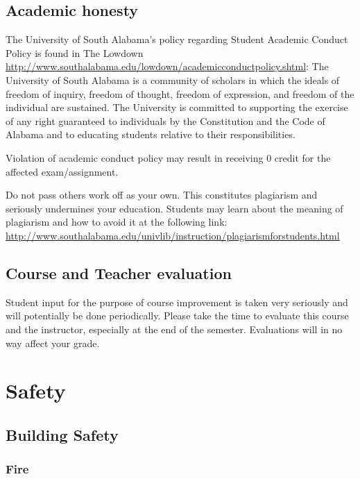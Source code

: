 \documentclass[11pt,]{article}
\begin{document}
\hypertarget{academic-honesty}{%
\subsection{Academic honesty}\label{academic-honesty}}

The University of South Alabama's policy regarding Student Academic
Conduct Policy is found in The Lowdown
\url{http://www.southalabama.edu/lowdown/academicconductpolicy.shtml}:
The University of South Alabama is a community of scholars in which the
ideals of freedom of inquiry, freedom of thought, freedom of expression,
and freedom of the individual are sustained. The University is committed
to supporting the exercise of any right guaranteed to individuals by the
Constitution and the Code of Alabama and to educating students relative
to their responsibilities.

Violation of academic conduct policy may result in receiving 0 credit
for the affected exam/assignment.

Do not pass others work off as your own. This constitutes plagiarism and
seriously undermines your education. Students may learn about the
meaning of plagiarism and how to avoid it at the following link:
\url{http://www.southalabama.edu/univlib/instruction/plagiarismforstudents.html}

\hypertarget{course-and-teacher-evaluation}{%
\subsection{Course and Teacher
evaluation}\label{course-and-teacher-evaluation}}

Student input for the purpose of course improvement is taken very
seriously and will potentially be done periodically. Please take the
time to evaluate this course and the instructor, especially at the end
of the semester. Evaluations will in no way affect your grade.

\hypertarget{safety}{%
\section{Safety}\label{safety}}

\hypertarget{building-safety}{%
\subsection{Building Safety}\label{building-safety}}

\hypertarget{fire}{%
\subsubsection{Fire}\label{fire}}
\end{document}
